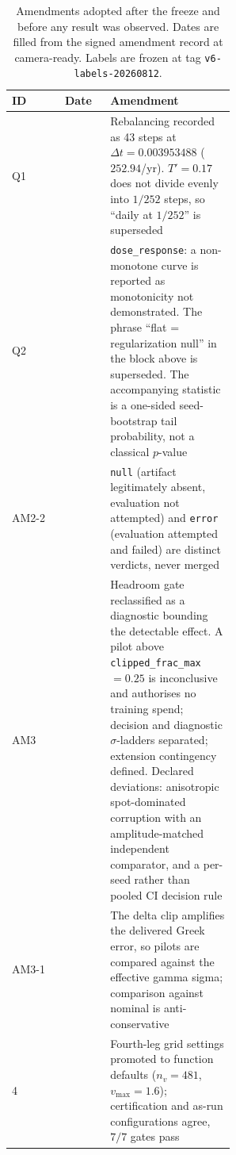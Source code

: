 \documentclass[10pt]{article}
\begin{document}
\begin{table}[h]
\centering\footnotesize
\begin{tabular}{@{}llp{0.56\linewidth}@{}}
\toprule
ID & Date & Amendment \\
\midrule
Q1 & & Rebalancing recorded as 43 steps at $\Delta t = 0.003953488$ ($252.94$/yr). $T'=0.17$ does not divide evenly into $1/252$ steps, so ``daily at $1/252$'' is superseded \\
Q2 & & \texttt{dose\_response}: a non-monotone curve is reported as monotonicity not demonstrated. The phrase ``flat = regularization null'' in the block above is superseded. The accompanying statistic is a one-sided seed-bootstrap tail probability, not a classical $p$-value \\
AM2-2 & & \texttt{null} (artifact legitimately absent, evaluation not attempted) and \texttt{error} (evaluation attempted and failed) are distinct verdicts, never merged \\
AM3 & & Headroom gate reclassified as a diagnostic bounding the detectable effect. A pilot above \texttt{clipped\_frac\_max} $=0.25$ is inconclusive and authorises no training spend; decision and diagnostic $\sigma$-ladders separated; extension contingency defined. Declared deviations: anisotropic spot-dominated corruption with an amplitude-matched independent comparator, and a per-seed rather than pooled CI decision rule \\
AM3-1 & & The delta clip amplifies the delivered Greek error, so pilots are compared against the effective gamma sigma; comparison against nominal is anti-conservative \\
4 & & Fourth-leg grid settings promoted to function defaults ($n_v = 481$, $v_{\max} = 1.6$); certification and as-run configurations agree, $7/7$ gates pass \\
\bottomrule
\end{tabular}
\caption{Amendments adopted after the freeze and before any result was observed.
Dates are filled from the signed amendment record at camera-ready. Labels are frozen
at tag \texttt{v6-labels-20260812}.}
\label{tab:amendments}
\end{table}
\end{document}

